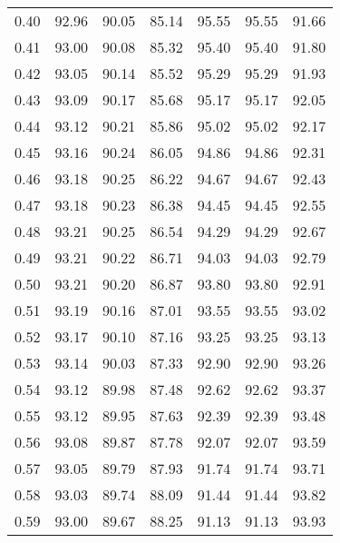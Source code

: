 \begin{tabular}{|c|c|c|c|c|c|c|}
      0.40 &     92.96 &     90.05 &      85.14 &   95.55 &      95.55 &         91.66 \\
      0.41 &     93.00 &     90.08 &      85.32 &   95.40 &      95.40 &         91.80 \\
      0.42 &     93.05 &     90.14 &      85.52 &   95.29 &      95.29 &         91.93 \\
      0.43 &     93.09 &     90.17 &      85.68 &   95.17 &      95.17 &         92.05 \\
      0.44 &     93.12 &     90.21 &      85.86 &   95.02 &      95.02 &         92.17 \\
      0.45 &     93.16 &     90.24 &      86.05 &   94.86 &      94.86 &         92.31 \\
      0.46 &     93.18 &     90.25 &      86.22 &   94.67 &      94.67 &         92.43 \\
      0.47 &     93.18 &     90.23 &      86.38 &   94.45 &      94.45 &         92.55 \\
      0.48 &     93.21 &     90.25 &      86.54 &   94.29 &      94.29 &         92.67 \\
      0.49 &     93.21 &     90.22 &      86.71 &   94.03 &      94.03 &         92.79 \\
      0.50 &     93.21 &     90.20 &      86.87 &   93.80 &      93.80 &         92.91 \\
      0.51 &     93.19 &     90.16 &      87.01 &   93.55 &      93.55 &         93.02 \\
      0.52 &     93.17 &     90.10 &      87.16 &   93.25 &      93.25 &         93.13 \\
      0.53 &     93.14 &     90.03 &      87.33 &   92.90 &      92.90 &         93.26 \\
      0.54 &     93.12 &     89.98 &      87.48 &   92.62 &      92.62 &         93.37 \\
      0.55 &     93.12 &     89.95 &      87.63 &   92.39 &      92.39 &         93.48 \\
      0.56 &     93.08 &     89.87 &      87.78 &   92.07 &      92.07 &         93.59 \\
      0.57 &     93.05 &     89.79 &      87.93 &   91.74 &      91.74 &         93.71 \\
      0.58 &     93.03 &     89.74 &      88.09 &   91.44 &      91.44 &         93.82 \\
      0.59 &     93.00 &     89.67 &      88.25 &   91.13 &      91.13 &         93.93 \\

\end{tabular}
